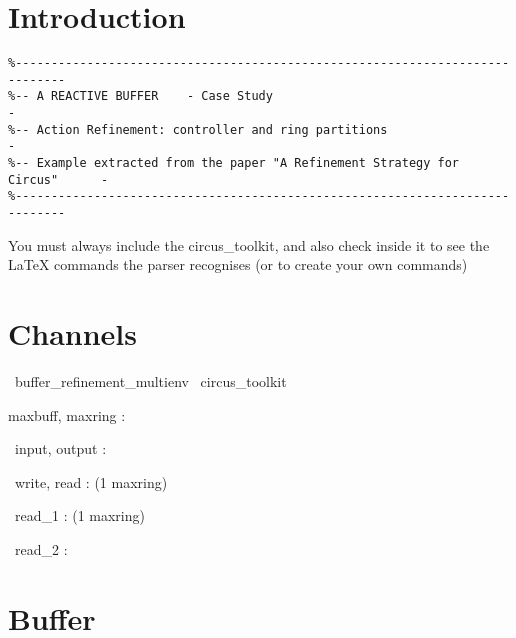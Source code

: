\documentclass{article}
\begin{document}
\section{Introduction}

\begin{verbatim}
%-----------------------------------------------------------------------------
%-- A REACTIVE BUFFER    - Case Study                                        -
%-- Action Refinement: controller and ring partitions                        -
%-- Example extracted from the paper "A Refinement Strategy for Circus"      -
%-----------------------------------------------------------------------------
\end{verbatim}


You must always include the circus\_toolkit, and also check inside
it to see the LaTeX commands the parser recognises (or to create
your own commands)

\section{Channels}

\begin{zsection}
  \SECTION\ buffer\_refinement\_multienv \parents\ circus\_toolkit
\end{zsection}

\begin{axdef}
 maxbuff, maxring : \nat
\end{axdef}

\begin{circus}
 \circchannel\ input, output : \nat
\end{circus}

\begin{circus}
 \circchannel\ write, read : (1 \upto maxring) \cross \nat
\end{circus}

\begin{circus}
 \circchannel\ read\_1 : (1 \upto maxring)
\end{circus}

\begin{circus}
 \circchannel\ read\_2 : \nat
\end{circus}

\CircusDeclSummary

\section{Buffer}
\end{document}
